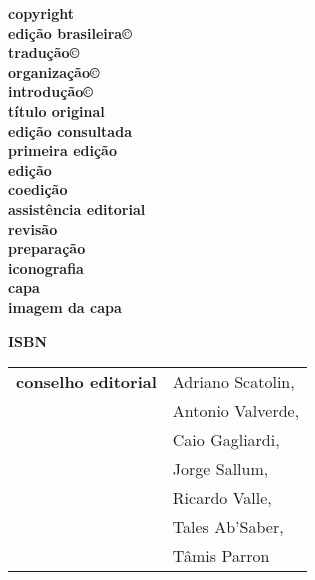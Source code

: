 \newcommand{\linha}[2]{\ifdef{#2}{\linhalayout{#1}{#2}}{}}

\begingroup\tiny
\parindent=0cm
\thispagestyle{empty}

\textbf{copyright}\quad                      {}\\
\textbf{edição brasileira©}\\
\textbf{tradução©}\\
\textbf{organização©}\quad			 		 {}\\
\textbf{introdução©}\\

\textbf{título original}\\
\textbf{edição consultada}\\
\textbf{primeira edição}\\

\textbf{edição}\\
\textbf{coedição}\\
\textbf{assistência editorial}\\
\textbf{revisão}\quad			 			 {}\\
\textbf{preparação}\\
\textbf{iconografia}\\
\textbf{capa}\quad			 				 {}\\
\textbf{imagem da capa}\medskip

\textbf{ISBN}\smallskip

\hspace{-5pt}\begin{tabular}{ll}
\textbf{conselho editorial}        & Adriano Scatolin,  \\
							& Antonio Valverde,  \\
							& Caio Gagliardi,    \\
							& Jorge Sallum,      \\
							& Ricardo Valle,     \\
							& Tales Ab'Saber,    \\
							& Tâmis Parron      
\end{tabular}
  
